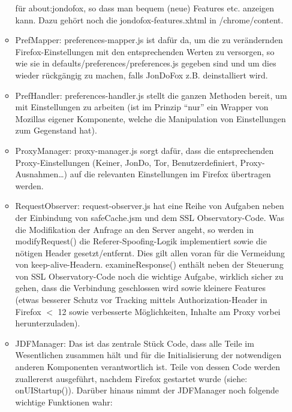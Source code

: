 \documentclass[a4paper,10pt]{scrartcl}
\begin{document}
\begin{itemize}
\begin{itemize}
            für about:jondofox, so dass man bequem (neue) Features etc. anzeigen
            kann. Dazu gehört noch die jondofox-features.xhtml in
            /chrome/content.
          \item PrefMapper: preferences-mapper.js ist dafür da, um die zu
            verändernden Firefox-Einstellungen mit den entsprechenden Werten zu
            versorgen, so wie sie in defaults/preferences/preferences.js gegeben
            sind und um dies wieder rückgängig zu machen, falls JonDoFox z.B.
            deinstalliert wird.
          \item PrefHandler: preferences-handler.js stellt die ganzen Methoden
            bereit, um mit Einstellungen zu arbeiten (ist im Prinzip ``nur'' ein
            Wrapper von Mozillas eigener Komponente, welche die Manipulation von
            Einstellungen zum Gegenstand hat).
          \item ProxyManager: proxy-manager.js sorgt dafür, dass die
            entsprechenden Proxy-Einstellungen (Keiner, JonDo, Tor,
            Benutzerdefiniert, Proxy-Ausnahmen\ldots) auf die relevanten
            Einstellungen im Firefox übertragen werden.
          \item RequestObserver: request-observer.js hat eine Reihe von Aufgaben
            neben der Einbindung von safeCache.jsm und dem SSL Observatory-Code.
            Was die Modifikation der Anfrage an den Server angeht, so werden in
            modifyRequest() die Referer-Spoofing-Logik implementiert sowie die
            nötigen Header gesetzt/entfernt. Dies gilt allen voran für die
            Vermeidung von keep-alive-Headern. examineResponse() enthält neben
            der Steuerung von SSL Observatory-Code noch die wichtige Aufgabe,
            wirklich sicher zu gehen, dass die Verbindung geschlossen wird sowie
            kleinere Features (etwas besserer Schutz vor Tracking mittels
            Authorization-Header in Firefox $<$ 12 sowie verbesserte
            Möglichkeiten, Inhalte am Proxy vorbei herunterzuladen).
          \item JDFManager: Das ist das zentrale Stück Code, dass alle Teile im
            Wesentlichen zusammen hält und für die Initialisierung der
            notwendigen anderen Komponenten verantwortlich ist. Teile von dessen
            Code werden zuallererst ausgeführt, nachdem Firefox gestartet wurde
            (siehe: onUIStartup()). Darüber hinaus nimmt der JDFManager noch
            folgende wichtige Funktionen wahr:
            \begin{itemize}

\end{itemize}
\end{itemize}
\end{itemize}
\end{document}
